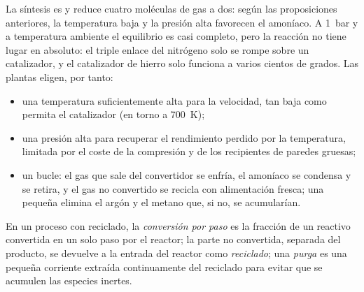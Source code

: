 La síntesis es  y reduce cuatro moléculas de gas a dos: según
las proposiciones anteriores, la temperatura baja y la presión alta favorecen el amoníaco.
A \qty{1}{bar} y a temperatura ambiente el equilibrio es casi completo, pero
la reacción no tiene lugar en absoluto: el triple enlace del nitrógeno solo se rompe
sobre un catalizador, y el catalizador de hierro solo funciona a varios cientos de
grados. Las plantas eligen, por tanto:
\begin{itemize}
  \item una temperatura suficientemente alta para la velocidad, tan baja como permita el catalizador
        (en torno a \qty{700}{K});
  \item una presión alta para recuperar el rendimiento perdido por la temperatura, limitada
        por el coste de la compresión y de los recipientes de paredes gruesas;
  \item un bucle: el gas que sale del convertidor se enfría, el amoníaco se condensa
        y se retira, y el gas no convertido se recicla con alimentación fresca;
        una pequeña  elimina el argón y el metano que, si no, se
        acumularían.
\end{itemize}

\begin{definition}\label{def:b2:equilibrium-shifts:single-pass}
En un proceso con reciclado, la \emph{conversión por paso}
es la fracción de un reactivo convertida en un solo paso por
el reactor; la parte no convertida, separada del producto, se devuelve
a la entrada del reactor como \emph{reciclado}; una
\emph{purga} es una pequeña corriente extraída continuamente del
reciclado para evitar que se acumulen las especies inertes.
\end{definition}

